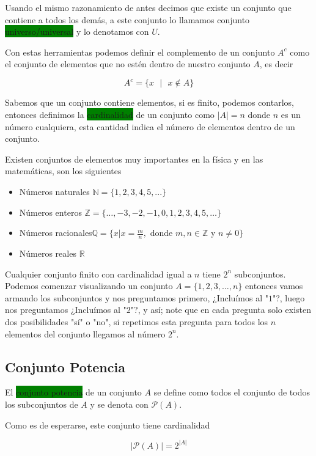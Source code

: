 \documentclass[11pt]{article}
\begin{document}
Usando el mismo razonamiento de antes decimos que existe un conjunto que contiene a todos los demás, a este conjunto lo llamamos conjunto \colorbox{Green}{universo/universal} y lo denotamos con $U$.

Con estas herramientas podemos definir el complemento de un conjunto $A^c$ como el conjunto de elementos que no estén dentro de nuestro conjunto $A$, es decir

\[
A^c=\{x\text{ }| \text{ }x\notin A\}
\]

Sabemos que un conjunto contiene elementos, si es finito, podemos contarlos, entonces definimos la \colorbox{Green}{cardinalidad} de un conjunto como $|A|=n$ donde $n$ es un número cualquiera, esta cantidad indica el número de elementos dentro de un conjunto.

Existen conjuntos de elementos muy importantes en la física y en las matemáticas, son los siguientes

\begin{itemize}
    \item Números naturales $\mathbb{N}=\{ 1,2,3,4,5,... \}$
    \item Números enteros $\mathbb{Z}=\{ \dotso,-3,-2,-1,0,1,2,3,4,5,\dotso \}$
    \item Números racionales$\mathbb{Q}=\{ x | x=\frac{m}{n},$ donde $ m,n \in \mathbb{Z} $ y $ n\neq 0 \}$
    \item Números reales $\mathbb{R}$
\end{itemize}

Cualquier conjunto finito con cardinalidad igual a $n$ tiene $2^n$ subconjuntos. Podemos comenzar visualizando un conjunto $A=\{1,2,3,\dotso,n\}$ entonces vamos armando los subconjuntos y nos preguntamos primero, ¿Incluímos al "$1$"?, luego nos preguntamos ¿Incluímos al "$2$"?, y así; note que en cada pregunta solo existen dos posibilidades "sí" o "no", si repetimos esta pregunta para todos los $n$ elementos del conjunto llegamos al número $2^n$.

\subsection{Conjunto Potencia}

El \colorbox{Green}{conjunto potencia} de un conjunto $A$ se define como todos el conjunto de todos los subconjuntos de $A$ y se denota con $\mathscr{P}(A)$.

Como es de esperarse, este conjunto tiene cardinalidad

\[
|\mathscr{P}(A)|=2^{|A|}
\]
\end{document}

